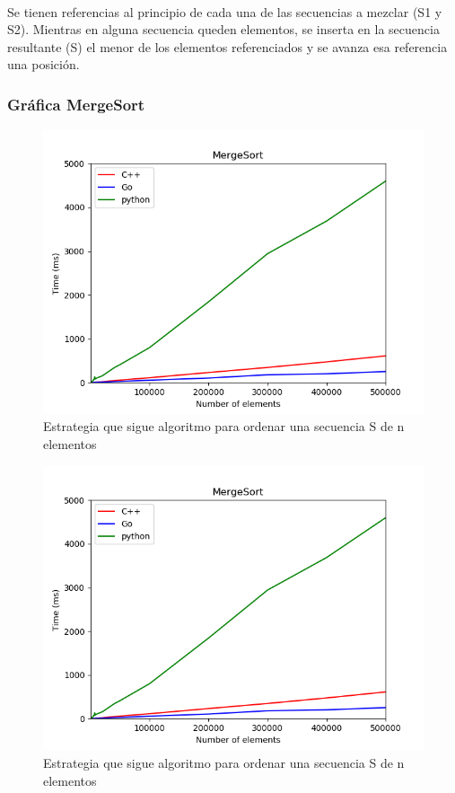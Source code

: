 \documentclass{article}
\begin{document}
    \paragraph {}
    Se tienen referencias al principio de cada una de las secuencias a mezclar (S1 y S2). Mientras en alguna secuencia queden elementos, se inserta en la secuencia resultante (S) el menor de los elementos referenciados y se avanza esa referencia una posición.
      \subsubsection{Gráfica MergeSort}
        \begin{figure}[h!]
            \centering
            \includegraphics[width=12cm]{img/mergeSort_1.png}
            \caption{Estrategia que sigue algoritmo para ordenar una secuencia S de n elementos}
            \label{fig:mergesort}
        \end {figure}
        \begin{figure}[h!]
            \centering
            \includegraphics[width=12cm]{img/mergeSort_1.png}
            \caption{Estrategia que sigue algoritmo para ordenar una secuencia S de n elementos}
            \label{fig:mergesort}
        \end {figure}
        
\end{document}
